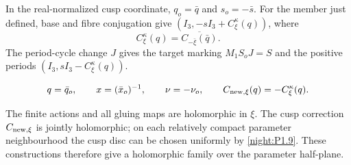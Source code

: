 In the real-normalized cusp coordinate,
$q_o=\bar q$ and $s_o=-\bar s$.
For the member just defined, base and fibre conjugation give
$(I_3,-sI_3+C^\kappa_\xi(q))$, where
\[
 C^\kappa_\xi(q)
   =\overline{C_{-\bar\xi}(\bar q)}.
\]
The period-cycle change $J$ gives the target marking
$M_1S_oJ=S$ and the positive periods
$(I_3,sI_3-C^\kappa_\xi(q))$.

\[
 q=\bar q_o,\qquad x=(\bar x_o)^{-1},\qquad
 \nu=-\nu_o,\qquad
 C_{{\rm new},\xi}(q)=-C^\kappa_\xi(q).
\]

The finite actions and all gluing maps are holomorphic in $\xi$.
The cusp correction $C_{{\rm new},\xi}$ is jointly holomorphic;
on each relatively compact parameter neighbourhood the cusp disc
can be chosen uniformly by \cref{night:P1.9}. These constructions
therefore give a holomorphic family over the parameter half-plane.
